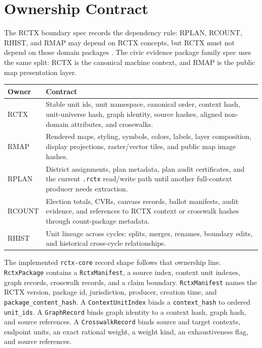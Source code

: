 \section{Ownership Contract}

The RCTX boundary spec records the dependency rule: RPLAN, RCOUNT, RHIST, and
RMAP may depend on RCTX concepts, but RCTX must not depend on those domain
packages \citep{rctx-boundary-2026}. The civic evidence package family spec
uses the same split: RCTX is the canonical machine context, and RMAP is the
public map presentation layer.

\begin{center}
\small
\begin{tabularx}{\textwidth}{lX}
\toprule
Owner & Contract \\
\midrule
RCTX & Stable unit ids, unit namespace, canonical order, context hash, unit-universe hash, graph identity, source hashes, aligned non-domain attributes, and crosswalks. \\
RMAP & Rendered maps, styling, symbols, colors, labels, layer composition, display projections, raster/vector tiles, and public map image hashes. \\
RPLAN & District assignments, plan metadata, plan audit certificates, and the current \texttt{.rctx} read/write path until another full-context producer needs extraction. \\
RCOUNT & Election totals, CVRs, canvass records, ballot manifests, audit evidence, and references to RCTX context or crosswalk hashes through count-package metadata. \\
RHIST & Unit lineage across cycles: splits, merges, renames, boundary edits, and historical cross-cycle relationships. \\
\bottomrule
\end{tabularx}
\end{center}

The implemented \texttt{rctx-core} record shape follows that ownership line.
\texttt{RctxPackage} contains a \texttt{RctxManifest}, a source index, context
unit indexes, graph records, crosswalk records, and a claim boundary.
\texttt{RctxManifest} names the RCTX version, package id, jurisdiction,
producer, creation time, and \texttt{package\_content\_hash}. A
\texttt{ContextUnitIndex} binds a \texttt{context\_hash} to ordered
\texttt{unit\_ids}. A \texttt{GraphRecord} binds graph identity to a context
hash, graph hash, and source references. A \texttt{CrosswalkRecord} binds
source and target contexts, endpoint units, an exact rational weight, a weight
kind, an exhaustiveness flag, and source references.

